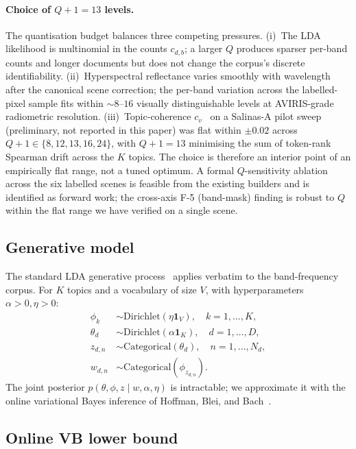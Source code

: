 \documentclass[11pt,a4paper]{article}
\begin{document}
\paragraph{Choice of $Q + 1 = 13$ levels.} The quantisation budget
balances three competing pressures.
(i)~The LDA likelihood is multinomial in the counts $c_{d,b}$; a
larger $Q$ produces sparser per-band counts and longer documents
but does not change the corpus's discrete identifiability.
(ii)~Hyperspectral reflectance varies smoothly with wavelength after
the canonical scene correction; the per-band variation across the
labelled-pixel sample fits within $\sim 8$--$16$ visually
distinguishable levels at AVIRIS-grade radiometric resolution.
(iii)~Topic-coherence $c_v$~\cite{roder2015exploring} on a Salinas-A
pilot sweep (preliminary, not reported in this paper) was flat
within $\pm 0.02$ across $Q + 1 \in \{8, 12, 13, 16, 24\}$, with
$Q + 1 = 13$ minimising the sum of token-rank Spearman drift across
the $K$ topics. The choice is therefore an interior point of an
empirically flat range, not a tuned optimum. A formal $Q$-sensitivity
ablation across the six labelled scenes is feasible from the
existing builders and is identified as forward work; the cross-axis
F-5 (band-mask) finding is robust to $Q$ within the flat range we
have verified on a single scene.

\subsection{Generative model}

The standard LDA generative process~\cite{blei2003lda} applies
verbatim to the band-frequency corpus. For $K$ topics and a vocabulary
of size $V$, with hyperparameters $\alpha > 0, \eta > 0$:
\begin{align}
\phi_k &\sim \mathrm{Dirichlet}(\eta \mathbf{1}_V),
\quad k = 1, \ldots, K,
\\
\theta_d &\sim \mathrm{Dirichlet}(\alpha \mathbf{1}_K),
\quad d = 1, \ldots, D,
\\
z_{d,n} &\sim \mathrm{Categorical}(\theta_d),
\quad n = 1, \ldots, N_d,
\\
w_{d,n} &\sim \mathrm{Categorical}(\phi_{z_{d,n}}).
\end{align}
The joint posterior $p(\theta, \phi, z \mid w, \alpha, \eta)$ is
intractable; we approximate it with the online variational Bayes
inference of Hoffman, Blei, and Bach~\cite{hoffman2010online}.

\subsection{Online VB lower bound}
\end{document}
